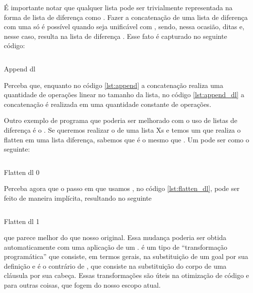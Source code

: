 É importante notar que qualquer lista  pode ser trivialmente
representada na forma de lista de diferença como
. Fazer a concatenação de uma lista de
diferença  com uma  só
é possível quando  seja unificável com , sendo, nessa
ocasião, ditas  e, nesse caso, resulta
na lista de diferença . Esse fato é capturado
no seguinte código:

\begin{listing}
  \inputminted{prolog}{../Exemplos/Cap3/prog5_concatenate_diff.pl}
  \caption{Append dl}\label{lst:append_dl}
\end{listing}

Perceba que, enquanto no código \ref{lst:append} a concatenação
realiza uma quantidade de operações linear no tamanho da lista, no
código \ref{lst:append_dl} a concatenação é realizada em uma
quantidade constante de operações.

Outro exemplo de programa que poderia ser melhorado com o uso de
listas de diferença é o . Se queremos realizar o
 de uma lista Xs e temos um 
que realiza o flatten em uma lista diferença, sabemos que
 é o mesmo que
. Um
 pode ser como o seguinte:

\begin{listing}
  \inputminted{prolog}{../Exemplos/Cap3/prog_flatten_dl1.pl}
  \caption{Flatten dl 0}\label{lst:flatten_dl}
\end{listing}

Perceba agora que o passo em que usamos , no
código \ref{lst:flatten_dl}, pode ser feito de maneira implícita,
resultando no seguinte

\begin{listing}
  \inputminted{prolog}{../Exemplos/Cap3/prog_flatten_dl2.pl}
  \caption{Flatten dl 1}\label{lst:flatten_dl2}
\end{listing}

\noindent que parece melhor do que nosso 
original. Essa mudança poderia ser obtida automaticamente com uma
aplicação de um .   é um
tipo de ``transformação programática'' que consiste, em termos gerais,
na substituição de um goal por sua definição e é o contrário de
, que consiste na substituição do corpo de uma
cláusula por sua cabeça. Essas transformações são úteis na otimização
de código e para outras coisas, que fogem do nosso escopo atual.

